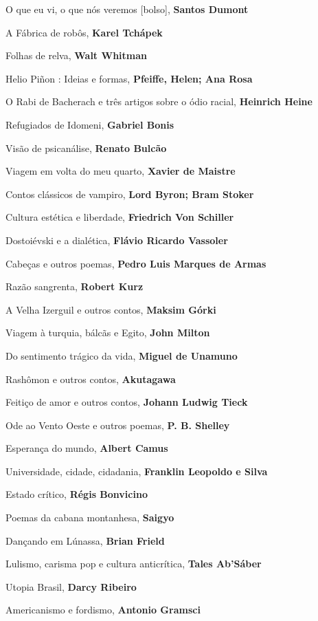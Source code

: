 \begin{multicols}{2}
\begin{enumerate}
{\item O que eu vi, o que nós veremos [bolso], \textbf{Santos Dumont}
\item A Fábrica de robôs, \textbf{Karel Tchápek}
\item Folhas de relva, \textbf{Walt Whitman}
\item Helio Piñon : Ideias e formas, \textbf{Pfeiffe, Helen; Ana Rosa}
\item O Rabi de Bacherach e três artigos sobre o ódio racial, \textbf{Heinrich Heine}
\item Refugiados de Idomeni, \textbf{Gabriel Bonis}
\item Visão de psicanálise, \textbf{Renato Bulcão}
\item Viagem em volta do meu quarto, \textbf{Xavier de Maistre}
\item Contos clássicos de vampiro, \textbf{Lord Byron; Bram Stoker}
\item Cultura estética e liberdade, \textbf{Friedrich Von Schiller}
\item Dostoiévski e a dialética, \textbf{Flávio Ricardo Vassoler}
\item Cabeças e outros poemas, \textbf{Pedro Luis Marques de Armas}
\item Razão sangrenta, \textbf{Robert Kurz}
\item A Velha Izerguil e outros contos, \textbf{Maksim Górki}
\item Viagem à turquia, bálcãs e Egito, \textbf{John Milton}
\item Do sentimento trágico da vida, \textbf{Miguel de Unamuno}
\item Rashômon e outros contos, \textbf{Akutagawa}
\item Feitiço de amor e outros contos, \textbf{Johann Ludwig Tieck}
\item Ode ao Vento Oeste e outros poemas, \textbf{P. B. Shelley}
\item Esperança do mundo, \textbf{Albert Camus}
\item Universidade, cidade, cidadania, \textbf{Franklin Leopoldo e Silva}
\item Estado crítico, \textbf{Régis Bonvicino}
\item Poemas da cabana montanhesa, \textbf{Saigyo}
\item Dançando em Lúnassa, \textbf{Brian Frield}
\item Lulismo, carisma pop e cultura anticrítica, \textbf{Tales Ab'Sáber}
\item Utopia Brasil, \textbf{Darcy Ribeiro}
\item Americanismo e fordismo, \textbf{Antonio Gramsci}
}
\end{enumerate}
\end{multicols}
